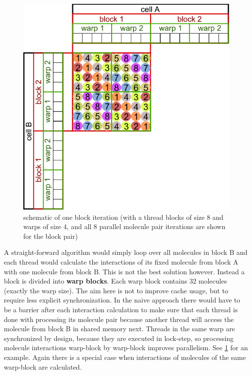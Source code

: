 \begin{figure}
\centering
\includegraphics{figures/cellprocessor_block_iteration_1.pdf}
\caption{schematic of one block iteration (with a thread blocks of size 8 and warps of size 4, and all 8 parallel molecule pair iterations are shown for the block pair)}
\label{fig:tbcp_block_iteration}
\end{figure}

A straight-forward algorithm would simply loop over all molecules in block B and each thread would calculate the interactions of its fixed molecule from block A with one molecule from block B.
This is not the best solution however. Instead a block is divided into \textbf{warp blocks}. Each warp block contains 32 molecules (exactly the warp size).
The aim here is not to improve cache usage, but to require less explicit synchronization.
In the naive approach there would have to be a barrier after each interaction calculation to make sure that each thread is done with processing its molecule pair because another thread will access the molecule from block B in shared memory next.
Threads in the same warp are synchronized by design, because they are executed in lock-step, so processing  molecule interactions warp-block by warp-block improves parallelism. See \ref{fig:tbcp_block_iteration} for an example.
Again there is a special case when interactions of molecules of the same warp-block are calculated.

